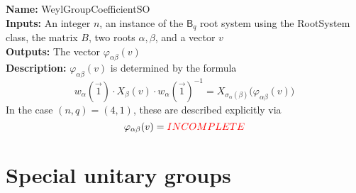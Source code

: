 \documentclass[12pt]{article}
\theoremstyle{definition}
\numberwithin{theorem}{subsection}
\newcommand{\sig}{\sigma}
\newcommand{\lp}{\left(}
\newcommand{\rp}{\right)}
\newcommand{\tbf}{\textbf}
\newcommand{\noi}{\noindent}
\newcommand{\incomplete}{\textcolor{red}{INCOMPLETE}}
\newcommand{\inv}{^{-1}}
\begin{document}
\begin{framed}
\noi \tbf{Name:} WeylGroupCoefficientSO \\
\noi \tbf{Inputs:} An integer $n$, an instance of the $\mathsf{B}_q$ root system using the RootSystem class, the matrix $B$, two roots $\alpha, \beta$, and a vector $v$  \\
\noi \tbf{Outputs:} The vector $\varphi_{\alpha \beta}(v)$ \\
\noi \tbf{Description:} $\varphi_{\alpha \beta}(v)$ is determined by the formula
\begin{equation}
\label{weyl conj}
	w_\alpha(\vec 1) \cdot X_{\beta} (v) \cdot w_\alpha ( \vec 1) \inv = X_{\sig_\alpha(\beta)} \Big( \varphi_{\alpha \beta}(v) \Big)
\end{equation}
In the case $(n,q) = (4,1)$, these are described explicitly via
\[
	\varphi_{\alpha \beta} (v) =  \incomplete
\]
\end{framed}

\newpage
\section{Special unitary groups}
\end{document}
